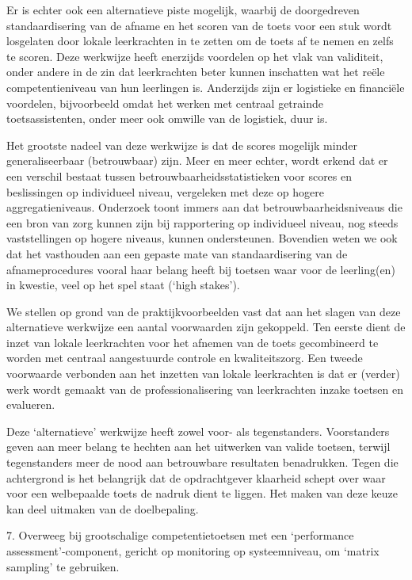 \documentclass[
  letterpaper,
]{report}
\begin{document}
Er is echter ook een alternatieve piste mogelijk, waarbij de
doorgedreven standaardisering van de afname en het scoren van de toets
voor een stuk wordt losgelaten door lokale leerkrachten in te zetten om
de toets af te nemen en zelfs te scoren. Deze werkwijze heeft enerzijds
voordelen op het vlak van validiteit, onder andere in de zin dat
leerkrachten beter kunnen inschatten wat het reële competentieniveau van
hun leerlingen is. Anderzijds zijn er logistieke en financiële
voordelen, bijvoorbeeld omdat het werken met centraal getrainde
toetsassistenten, onder meer ook omwille van de logistiek, duur is.

Het grootste nadeel van deze werkwijze is dat de scores mogelijk minder
generaliseerbaar (betrouwbaar) zijn. Meer en meer echter, wordt erkend
dat er een verschil bestaat tussen betrouwbaarheidsstatistieken voor
scores en beslissingen op individueel niveau, vergeleken met deze op
hogere aggregatieniveaus. Onderzoek toont immers aan dat
betrouwbaarheidsniveaus die een bron van zorg kunnen zijn bij
rapportering op individueel niveau, nog steeds vaststellingen op hogere
niveaus, kunnen ondersteunen. Bovendien weten we ook dat het vasthouden
aan een gepaste mate van standaardisering van de afnameprocedures vooral
haar belang heeft bij toetsen waar voor de leerling(en) in kwestie, veel
op het spel staat (`high stakes').

We stellen op grond van de praktijkvoorbeelden vast dat aan het slagen
van deze alternatieve werkwijze een aantal voorwaarden zijn gekoppeld.
Ten eerste dient de inzet van lokale leerkrachten voor het afnemen van
de toets gecombineerd te worden met centraal aangestuurde controle en
kwaliteitszorg. Een tweede voorwaarde verbonden aan het inzetten van
lokale leerkrachten is dat er (verder) werk wordt gemaakt van de
professionalisering van leerkrachten inzake toetsen en evalueren.

Deze `alternatieve' werkwijze heeft zowel voor- als tegenstanders.
Voorstanders geven aan meer belang te hechten aan het uitwerken van
valide toetsen, terwijl tegenstanders meer de nood aan betrouwbare
resultaten benadrukken. Tegen die achtergrond is het belangrijk dat de
opdrachtgever klaarheid schept over waar voor een welbepaalde toets de
nadruk dient te liggen. Het maken van deze keuze kan deel uitmaken van
de doelbepaling.

{ 7. Overweeg bij grootschalige competentietoetsen met een `performance
assessment'-component, gericht op monitoring op systeemniveau, om
`matrix sampling' te gebruiken. }
\end{document}
